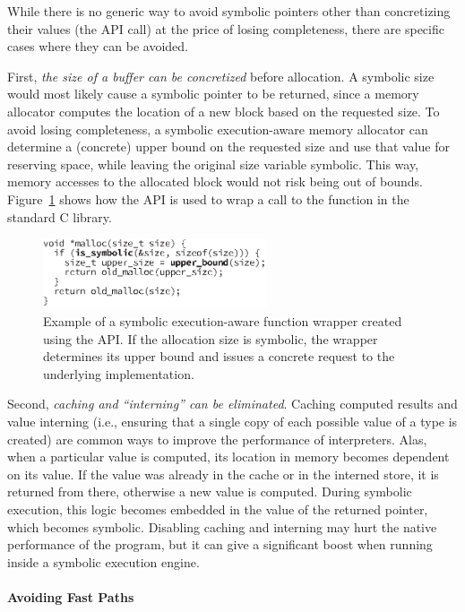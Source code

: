 While there is no generic way to avoid symbolic pointers other than concretizing their values (the  API call) at the price of losing completeness, there are specific cases where they can be avoided.

First, \emph{the size of a buffer can be concretized} before allocation.  A symbolic size would most likely cause a symbolic pointer to be returned, since a memory allocator computes the location of a new block based on the requested size.  To avoid losing completeness, a symbolic execution-aware memory allocator can determine a (concrete) upper bound on the requested size and use that value for reserving space, while leaving the original size variable symbolic.  This way, memory accesses to the allocated block would not risk being out of bounds.  Figure~\ref{fig:sym-malloc} shows how the \chef API is used to wrap a call to the  function in the standard C library.

\begin{figure}
  \centering
  \includegraphics[width=2.6in]{figures/chef/mallocopt}
  \caption{Example of a symbolic execution-aware  function wrapper created using the \chef API.  If the allocation size is symbolic, the wrapper determines its upper bound and issues a concrete request to the underlying implementation.}
  \label{fig:sym-malloc}
\end{figure}

Second, \emph{caching and ``interning'' can be eliminated}.  Caching computed results and value interning (i.e., ensuring that a single copy of each possible value of a type is created) are common ways to improve the performance of interpreters.  Alas, when a particular value is computed, its location in memory becomes dependent on its value. If the value was already in the cache or in the interned store, it is returned from there, otherwise a new value is computed.  During symbolic execution, this logic becomes embedded in the value of the returned pointer, which becomes symbolic.  Disabling caching and interning may hurt the native performance of the program, but it can give a significant boost when running inside a symbolic execution engine.

\paragraph{Avoiding Fast Paths}

